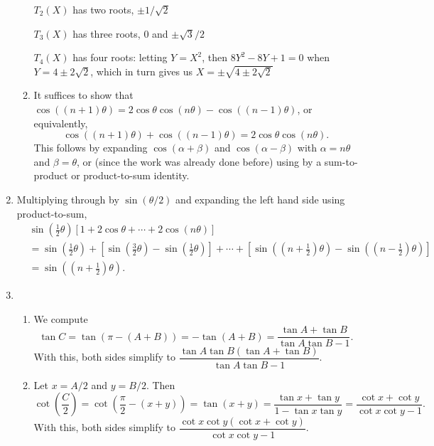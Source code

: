 \begin{enumerate}
\begin{enumerate}
$T_2(X)$ has two roots, $\pm 1/\sqrt{2}$\par
$T_3(X)$ has three roots, $0$ and $\pm\sqrt{3}/2$\par
$T_4(X)$ has four roots: letting $Y = X^2$, then $8Y^2 - 8Y + 1 = 0$ when $Y = 4\pm 2\sqrt{2}$, which in turn gives us $X = \pm\sqrt{4\pm 2\sqrt{2}}$
\item It suffices to show that $\cos((n + 1)\theta) = 2\cos\theta\cos(n\theta) - \cos((n - 1)\theta)$, or equivalently,
\begin{equation*}
\cos((n + 1)\theta) + \cos((n - 1)\theta) = 2\cos\theta\cos(n\theta).
\end{equation*}
This follows by expanding $\cos(\alpha + \beta)$ and $\cos(\alpha - \beta)$ with $\alpha = n\theta$ and $\beta = \theta$, or (since the work was already done before) using by a sum-to-product or product-to-sum identity.
\end{enumerate}
\item Multiplying through by $\sin(\theta/2)$ and expanding the left hand side using product-to-sum,
\begin{align*}
&\sin\left(\frac{1}{2}\theta\right)\left[1 + 2\cos\theta + \cdots + 2\cos (n\theta)\right] \\
&= \sin\left(\frac{1}{2}\theta\right) + \left[\sin\left(\frac{3}{2}\theta\right) - \sin\left(\frac{1}{2}\theta\right)\right] + \cdots + \left[\sin\left(\left(n + \frac{1}{2}\right)\theta\right) - \sin\left(\left(n - \frac{1}{2}\right)\theta\right)\right] \\
&= \sin\left(\left(n + \frac{1}{2}\right)\theta\right).
\end{align*}
\item \begin{enumerate}
\item We compute
\begin{equation*}
\tan C = \tan(\pi - (A + B)) = -\tan(A + B) = \frac{\tan A + \tan B}{\tan A\tan B - 1}.
\end{equation*}
With this, both sides simplify to $\dfrac{\tan A\tan B(\tan A + \tan B)}{\tan A\tan B - 1}$.
\item Let $x = A/2$ and $y = B/2$. Then
\begin{equation*}
\cot\left(\frac{C}{2}\right) = \cot\left(\frac{\pi}{2} - (x + y)\right) = \tan(x + y) = \frac{\tan x + \tan y}{1 - \tan x\tan y} = \frac{\cot x + \cot y}{\cot x\cot y - 1}.
\end{equation*}
With this, both sides simplify to $\dfrac{\cot x\cot y(\cot x + \cot y)}{\cot x\cot y - 1}$.

\end{enumerate}
\end{enumerate}
